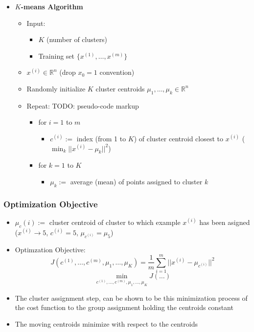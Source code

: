 \begin{itemize}[--]
	\item \textbf{$K$-means Algorithm}
	\begin{itemize}[--]
		\item Input:
		\begin{itemize}[--]
			\item $K$ (number of clusters)
			\item Training set $\{ x^{(1)}, \ldots, x^{(m)}\}$
		\end{itemize}
		\item $x^{(i)}\in\mathbb{R}^n $ (drop $x_0=1$ convention)
		\item Randomly initialize $K$ cluster centroids $\mu_1,\ldots, \mu_k \in\mathbb{R}^n$
		\item Repeat: TODO: pseudo-code markup
		\begin{itemize}[--]
			\item for $i=1$ to $m$
			\begin{itemize}[--]
				\item $c^{(i)} :=$ index (from 1 to $K$) of cluster centroid closest to $x^{(i)}$ ($\min_k ||x^{(i)} -\mu_k||^2$)
			\end{itemize}
			\item for $k=1$ to $K$
			\begin{itemize}[--]
				\item $\mu_k :=$ average (mean) of points assigned to cluster $k$
			\end{itemize}
		\end{itemize}
	\end{itemize}
\end{itemize}

\subsubsection{Optimization Objective}
\begin{itemize}[--]
	\item $\mu_c (i):=$ cluster centroid of cluster to which example $x^{(i)}$ has been asigned ($x^{(i)}\to 5$, $c^{(i)}=5$, $\mu_{c^{(i)}} =\mu_5$)
	\item Optimzation Objective:
		$$J(c^{(1)},\ldots, c^{(m)}, \mu_1,\ldots, \mu_K )=\frac{1}{m}\sum_{i=1}^{m}||x^{(i)}-\mu_{c^{(i)}}||^2$$
		$$\min_{c^{(1)},\ldots, c^{(m)}, \mu_1, \ldots, \mu_K} J(\ldots )$$
	\item The cluster assignment step, can be shown to be this minimization process of the cost function to the group assignment holding the centroids constant
	\item The moving centroids minimize with respect to the centroids
\end{itemize}

